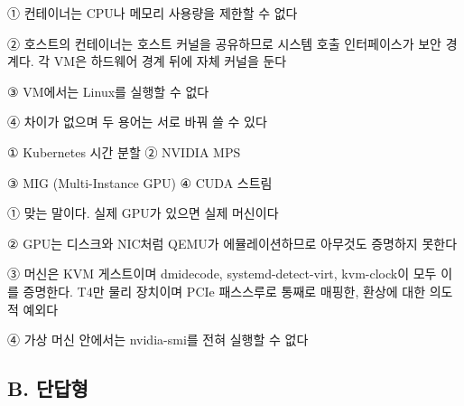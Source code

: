 
\begin{tbboptions}
  \item ① 컨테이너는 CPU나 메모리 사용량을 제한할 수 없다
  \item ② 호스트의 컨테이너는 호스트 커널을 공유하므로 시스템 호출 인터페이스가 보안 경계다. 각 VM은 하드웨어 경계 뒤에 자체 커널을 둔다
  \item ③ VM에서는 Linux를 실행할 수 없다
  \item ④ 차이가 없으며 두 용어는 서로 바꿔 쓸 수 있다
\end{tbboptions}


\begin{tbboptions}
  \item ① Kubernetes 시간 분할        ② NVIDIA MPS
  \item ③ MIG (Multi-Instance GPU)      ④ CUDA 스트림
\end{tbboptions}


\begin{tbboptions}
  \item ① 맞는 말이다. 실제 GPU가 있으면 실제 머신이다
  \item ② GPU는 디스크와 NIC처럼 QEMU가 에뮬레이션하므로 아무것도 증명하지 못한다
  \item ③ 머신은 KVM 게스트이며 dmidecode, systemd-detect-virt, kvm-clock이 모두 이를 증명한다. T4만 물리 장치이며 PCIe 패스스루로 통째로 매핑한, 환상에 대한 의도적 예외다
  \item ④ 가상 머신 안에서는 nvidia-smi를 전혀 실행할 수 없다
\end{tbboptions}

\subsection*{B. 단답형}



